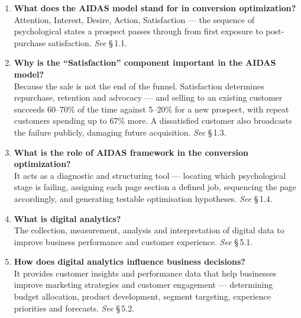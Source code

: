 \begin{enumerate}[leftmargin=2.2em,itemsep=1.1ex]

\item \textbf{What does the AIDAS model stand for in conversion optimization?}
      \\
      Attention, Interest, Desire, Action, Satisfaction --- the sequence of
      psychological states a prospect passes through from first exposure to
      post-purchase satisfaction. \hfill\emph{See} \S\,1.1.

\item \textbf{Why is the ``Satisfaction'' component important in the AIDAS
      model?} \\
      Because the sale is not the end of the funnel. Satisfaction determines
      repurchase, retention and advocacy --- and selling to an existing customer
      succeeds 60--70\% of the time against 5--20\% for a new prospect, with
      repeat customers spending up to 67\% more. A dissatisfied customer also
      broadcasts the failure publicly, damaging future acquisition.
      \hfill\emph{See} \S\,1.3.

\item \textbf{What is the role of AIDAS framework in the conversion
      optimization?} \\
      It acts as a diagnostic and structuring tool --- locating which
      psychological stage is failing, assigning each page section a defined job,
      sequencing the page accordingly, and generating testable optimisation
      hypotheses. \hfill\emph{See} \S\,1.4.

\item \textbf{What is digital analytics?} \\
      The collection, measurement, analysis and interpretation of digital data to
      improve business performance and customer experience.
      \hfill\emph{See} \S\,5.1.

\item \textbf{How does digital analytics influence business decisions?}
      \\
      It provides customer insights and performance data that help businesses
      improve marketing strategies and customer engagement --- determining budget
      allocation, product development, segment targeting, experience priorities
      and forecasts. \hfill\emph{See} \S\,5.2.


\end{enumerate}
